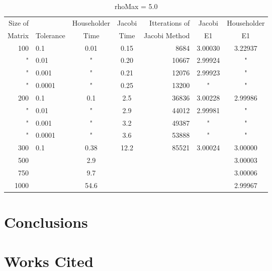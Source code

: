 \documentclass{article}
\begin{document}
\begin{table}
	\centering
	\begin{tabular}{ r | l || c | c | r | c | c}
		Size of &           & Householder & Jacobi & Itterations of & Jacobi & Householder \\
		Matrix  & Tolerance &    Time     &  Time  & Jacobi Method  &   E1   &      E1     \\
		\hline
		 100 & 0.1    & 0.01 &  0.15 &  8684 & 3.00030 & 3.22937 \\
		  "  & 0.01   &  "   &  0.20 & 10667 & 2.99924 &    "    \\
		  "  & 0.001  &  "   &  0.21 & 12076 & 2.99923 &    "    \\
		  "  & 0.0001 &  "   &  0.25 & 13200 &    "    &    "    \\
		 200 & 0.1    & 0.1  &  2.5  & 36836 & 3.00228 & 2.99986 \\
		  "  & 0.01   &  "   &  2.9  & 44012 & 2.99981 &    "    \\
		  "  & 0.001  &  "   &  3.2  & 49387 &    "    &    "    \\
		  "  & 0.0001 &  "   &  3.6  & 53888 &    "    &    "    \\
		 300 & 0.1    & 0.38 & 12.2  & 85521 & 3.00024 & 3.00000 \\
		 500 &        & 2.9  &       &       &         & 3.00003 \\
		 750 &        & 9.7  &       &       &         & 3.00006 \\ 
		1000 &        & 54.6 &       &       &         & 2.99967 \\
		
	\end{tabular}
	\caption{rhoMax = 5.0}
\end{table}


\section{Conclusions}

\section{Works Cited}
\end{document}
